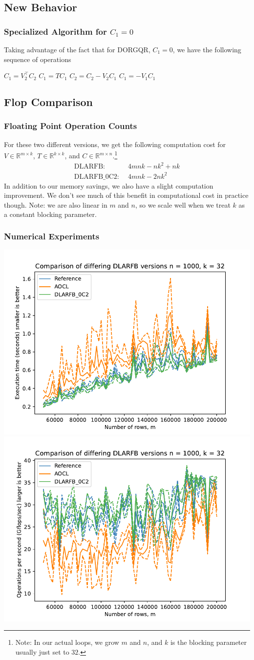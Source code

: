 \documentclass[12pt,aspectratio=169]{beamer}
\newcommand{\R}{\mathbb{R}}
\begin{document}
    \subsection{New Behavior}
    \begin{frame}
        \frametitle{Specialized Algorithm for $C_1 = 0$}
        Taking advantage of the fact that for DORGQR, $C_1 = 0$, we have the following sequence of operations
        \begin{algorithmic}[1]
            \State $C_1 = V_2^\top C_2$
            \State $C_1 = TC_1$
            \State $C_2 = C_2 - V_2C_1$
            \State $C_1 =     - V_1C_1$
        \end{algorithmic}
    \end{frame}
    \subsection{Flop Comparison}
    \begin{frame}
        \frametitle{Floating Point Operation Counts}
        For these two different versions, we get the following computation cost for $V\in\R^{m\times k}$, $T\in\R^{k\times k}$, and $C\in\R^{m\times n}$.\footnote{Note: In our actual loops, we grow $m$ and $n$, and $k$ is the blocking parameter usually just set to $32$.}
        \begin{align*}
            \text{DLARFB: }&\, 4mnk - nk^2 + nk\\
            \text{DLARFB\_0C2: }&\, 4mnk - 2nk^2
        \end{align*}
        In addition to our memory savings, we also have a slight computation improvement. We don't see
        much of this benefit in computational cost in practice though. Note: we are also linear in $m$ and
        $n$, so we scale well when we treat $k$ as a constant blocking parameter.
    \end{frame}
    \begin{frame}
        \frametitle{Numerical Experiments}
        \begin{center}
        \includegraphics[width=.45\textwidth]{figures/timeDLARFB.pdf}
        \includegraphics[width=.45\textwidth]{figures/flopDLARFB.pdf}
        \end{center}
    \end{frame}
\end{document}
